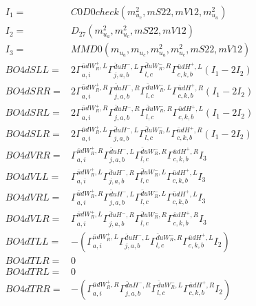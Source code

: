 \documentclass[A4,landscape]{article}
\begin{document}
\begin{align} 
I_1 = & C0D0check(m^2_{u_{{c}}}, mS22, mV12, m^2_{u_{{a}}}) \\ 
I_2 = & D_{27}(m^2_{u_{{a}}}, m^2_{u_{{c}}}, mS22, mV12) \\ 
I_3 = & MMD0(m_{u_{{a}}}, m_{u_{{c}}}, m^2_{u_{{a}}}, m^2_{u_{{c}}}, mS22, mV12) \\ 
  BO4dSLL= & 2  \Gamma^{\bar{u}d W_R^+,L}_{a, i} \Gamma^{\bar{d}u H^- ,L}_{j, a, b} \Gamma^{\bar{d}u W_R^- ,R}_{l, c} \Gamma^{\bar{u}d H^+,L}_{c, k, b} (I_1 - 2 I_2) \\ 
  BO4dSRR= & 2  \Gamma^{\bar{u}d W_R^+,R}_{a, i} \Gamma^{\bar{d}u H^- ,R}_{j, a, b} \Gamma^{\bar{d}u W_R^- ,L}_{l, c} \Gamma^{\bar{u}d H^+,R}_{c, k, b} (I_1 - 2 I_2) \\ 
  BO4dSRL= & 2  \Gamma^{\bar{u}d W_R^+,R}_{a, i} \Gamma^{\bar{d}u H^- ,R}_{j, a, b} \Gamma^{\bar{d}u W_R^- ,R}_{l, c} \Gamma^{\bar{u}d H^+,L}_{c, k, b} (I_1 - 2 I_2) \\ 
  BO4dSLR= & 2  \Gamma^{\bar{u}d W_R^+,L}_{a, i} \Gamma^{\bar{d}u H^- ,L}_{j, a, b} \Gamma^{\bar{d}u W_R^- ,L}_{l, c} \Gamma^{\bar{u}d H^+,R}_{c, k, b} (I_1 - 2 I_2) \\ 
  BO4dVRR= &  \Gamma^{\bar{u}d W_R^+,R}_{a, i} \Gamma^{\bar{d}u H^- ,L}_{j, a, b} \Gamma^{\bar{d}u W_R^- ,R}_{l, c} \Gamma^{\bar{u}d H^+,R}_{c, k, b} I_3 \\ 
  BO4dVLL= &  \Gamma^{\bar{u}d W_R^+,L}_{a, i} \Gamma^{\bar{d}u H^- ,R}_{j, a, b} \Gamma^{\bar{d}u W_R^- ,L}_{l, c} \Gamma^{\bar{u}d H^+,L}_{c, k, b} I_3 \\ 
  BO4dVRL= &  \Gamma^{\bar{u}d W_R^+,R}_{a, i} \Gamma^{\bar{d}u H^- ,L}_{j, a, b} \Gamma^{\bar{d}u W_R^- ,L}_{l, c} \Gamma^{\bar{u}d H^+,L}_{c, k, b} I_3 \\ 
  BO4dVLR= &  \Gamma^{\bar{u}d W_R^+,L}_{a, i} \Gamma^{\bar{d}u H^- ,R}_{j, a, b} \Gamma^{\bar{d}u W_R^- ,R}_{l, c} \Gamma^{\bar{u}d H^+,R}_{c, k, b} I_3 \\ 
  BO4dTLL= & -( \Gamma^{\bar{u}d W_R^+,L}_{a, i} \Gamma^{\bar{d}u H^- ,L}_{j, a, b} \Gamma^{\bar{d}u W_R^- ,R}_{l, c} \Gamma^{\bar{u}d H^+,L}_{c, k, b} I_2) \\ 
  BO4dTLR= & 0 \\ 
  BO4dTRL= & 0 \\ 
  BO4dTRR= & -( \Gamma^{\bar{u}d W_R^+,R}_{a, i} \Gamma^{\bar{d}u H^- ,R}_{j, a, b} \Gamma^{\bar{d}u W_R^- ,L}_{l, c} \Gamma^{\bar{u}d H^+,R}_{c, k, b} I_2) \\ 
\end{align} 
\end{document}
